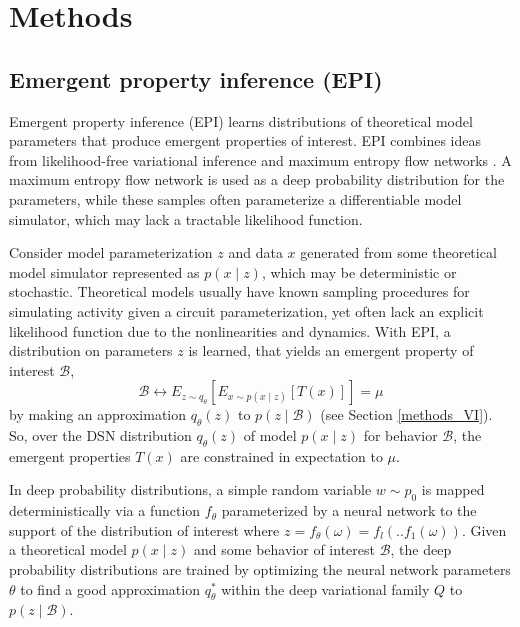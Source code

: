 \documentclass[11pt]{article}
\begin{document}



\appendix

\section{Methods}

\subsection{Emergent property inference (EPI)}\label{methods_EPI}
Emergent property inference (EPI) learns distributions of theoretical model parameters that produce emergent properties of interest.  EPI combines ideas from likelihood-free variational inference \cite{tran2017hierarchical} and maximum entropy flow networks \cite{loaiza2017maximum}.  A maximum entropy flow network is used as a deep probability distribution for the parameters, while these samples often parameterize a differentiable model simulator, which may lack a tractable likelihood function.

Consider model parameterization $z$ and data $x$ generated from some theoretical model simulator represented as $p(x \mid z)$, which may be deterministic or stochastic.  Theoretical models usually have known sampling procedures for simulating activity given a circuit parameterization, yet often lack an explicit likelihood function due to the nonlinearities and dynamics. With EPI, a distribution on parameters $z$ is learned, that yields an emergent property of interest $\mathcal{B}$,
\begin{equation}
\mathcal{B} \leftrightarrow E_{z \sim q_\theta}\left[ E_{x\sim p(x \mid z)}\left[T(x)\right] \right] = \mu
\end{equation}
by making an approximation $q_\theta(z)$ to $p(z \mid \mathcal{B})$ (see Section \ref{methods_VI}).  So, over the DSN distribution $q_\theta(z)$ of model $p(x \mid z)$ for behavior $\mathcal{B}$, the emergent properties $T(x)$ are constrained in expectation to $\mu$.

 In deep probability distributions, a simple random variable $w \sim p_0$ is mapped deterministically via a function $f_\theta$ parameterized by a neural network to the support of the distribution of interest where $z = f_{\theta}(\omega) = f_l(..f_1(\omega))$.  Given a theoretical model $p(x \mid z)$ and some behavior of interest $\mathcal{B}$, the deep probability distributions are trained by optimizing the neural network parameters $\theta$ to find a good approximation $q_{\theta}^*$ within the deep variational family $Q$ to $p(z \mid \mathcal{B})$.
\end{document}
